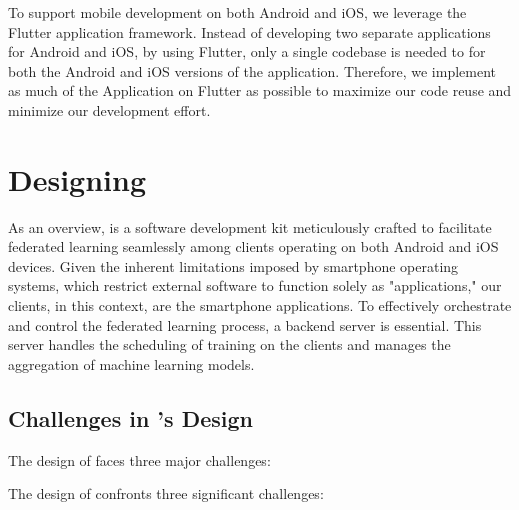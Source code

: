 To support mobile development on both Android and iOS,
we leverage the Flutter application framework.
Instead of developing two separate applications for Android and iOS,
by using Flutter,
only a single codebase is needed to for both the Android and iOS versions of
the application.
Therefore, we implement as much of the \fedcampus Application on Flutter as
possible to maximize our code reuse and minimize our development effort.

\section{Designing \fedkit}

As an overview,
\fedkit is a software development kit meticulously crafted to facilitate
federated learning seamlessly among clients operating on both Android and iOS
devices. Given the inherent limitations imposed by smartphone operating systems,
which restrict external software to function solely as "applications," our
clients, in this context, are the smartphone applications.
To effectively orchestrate and control the federated learning process,
a backend server is essential.
This server handles the scheduling of training on the clients and manages the
aggregation of machine learning models.

\subsection{Challenges in \fedkit's Design}

The design of \fedkit faces three major challenges:

The design of \fedkit confronts three significant challenges:

